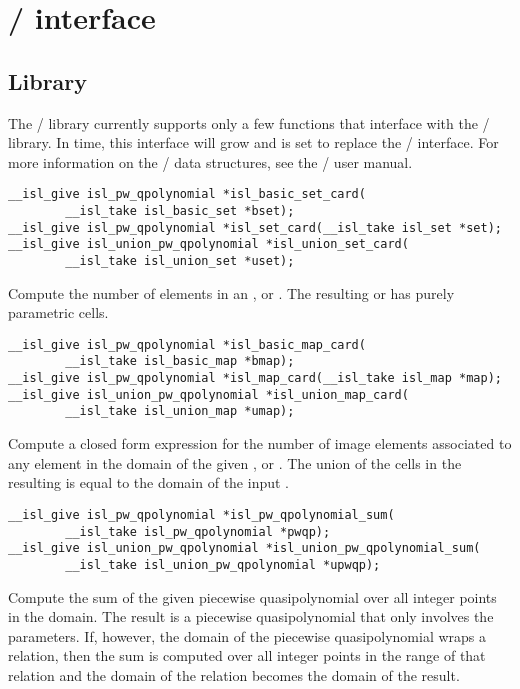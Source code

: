 \section{\protect\isl/ interface}

\let\llt\prec
\let\lle\preccurlyeq
\let\lgt\succ

\subsection{Library}

The \barvinok/ library currently supports only a few
functions that interface with the \isl/ library.
In time, this interface will grow and is set to replace
the \PolyLib/ interface.
For more information on the \isl/ data structures, see
the \isl/ user manual.

\begin{verbatim}
__isl_give isl_pw_qpolynomial *isl_basic_set_card(
        __isl_take isl_basic_set *bset);
__isl_give isl_pw_qpolynomial *isl_set_card(__isl_take isl_set *set);
__isl_give isl_union_pw_qpolynomial *isl_union_set_card(
        __isl_take isl_union_set *uset);
\end{verbatim}
Compute the number of elements in an ,
 or .
The resulting 
or  has purely parametric cells.

\begin{verbatim}
__isl_give isl_pw_qpolynomial *isl_basic_map_card(
        __isl_take isl_basic_map *bmap);
__isl_give isl_pw_qpolynomial *isl_map_card(__isl_take isl_map *map);
__isl_give isl_union_pw_qpolynomial *isl_union_map_card(
        __isl_take isl_union_map *umap);
\end{verbatim}
Compute a closed form expression for the number of image elements
associated to any element in the domain of the given ,
 or .
The union of the cells in the resulting 
is equal to the domain of the input .

\begin{verbatim}
__isl_give isl_pw_qpolynomial *isl_pw_qpolynomial_sum(
        __isl_take isl_pw_qpolynomial *pwqp);
__isl_give isl_union_pw_qpolynomial *isl_union_pw_qpolynomial_sum(
        __isl_take isl_union_pw_qpolynomial *upwqp);
\end{verbatim}
Compute the sum of the given piecewise quasipolynomial over
all integer points in the domain.  The result is a piecewise
quasipolynomial that only involves the parameters.
If, however, the domain of the piecewise quasipolynomial wraps
a relation, then the sum is computed over all integer points
in the range of that relation and the domain of the relation
becomes the domain of the result.

